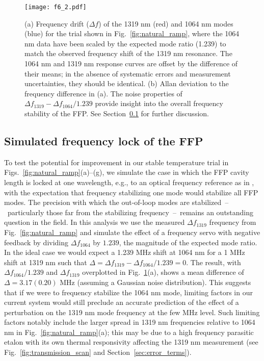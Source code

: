 \documentclass[10pt]{article}
\begin{document}
\begin{figure}
\texttt{[image: f6\_2.pdf]}
\caption{(a) Frequency drift ($\Delta f$) of the 1319 nm (red) and 1064 nm modes (blue) for the trial shown in Fig.~\ref{fig:natural_ramp}, where the 1064 nm data have been scaled by the expected mode ratio (1.239) to match the observed frequency shift of the 1319 nm resonance. The 1064 nm and 1319 nm response curves are offset by the difference of their means; in the absence of systematic errors and measurement uncertainties, they should be identical. (b) Allan deviation to the frequency difference in (a). The noise properties of $\Delta f_{1319} - \Delta f_{1064}/1.239$ provide insight into the overall frequency stability of the FFP. See Section~\ref{sec:servo} for further discussion.}
\label{fig:adev}
\end{figure}

\subsection{Simulated frequency lock of the FFP}
\label{sec:servo}
To test the potential for improvement in our stable temperature trial in Figs.~\ref{fig:natural_ramp}(a)--(g), we simulate the case in which the FFP cavity length is locked at one wavelength, e.g., to an optical frequency reference as in \cite{Banerjee:2003,Reiners:2014,Schwab:2015}, with the expectation that frequency stabilizing one mode would stabilize all FFP modes.  The precision with which the out-of-loop modes are stabilized\ --\ particularly those far from the stabilizing frequency\ --\ remains an outstanding question in the field.  In this analysis we use the measured $\Delta f_{1319}$ frequency from Fig.~\ref{fig:natural_ramp} and simulate the effect of a frequency servo with negative feedback by dividing $\Delta f_{1064}$ by $1.239$, the magnitude of the expected mode ratio.  In the ideal case we would expect a 1.239 MHz shift at 1064 nm for a 1 MHz shift at 1319 nm such that $\Delta = \Delta f_{1319} - \Delta f_{1064}/1.239 = 0$. The result, with $\Delta f_{1064}/1.239$ and $\Delta f_{1319}$ overplotted in Fig.~\ref{fig:adev}(a), shows a mean difference of $\Delta = 3.17(0.20)$ MHz (assuming a Gaussian noise distribution). This suggests that if we were to frequency stabilize the 1064 nm mode, limiting factors in our current system would still preclude an accurate prediction of the effect of a perturbation on the 1319 nm mode frequency at the few MHz level. Such limiting factors notably include the larger spread in 1319 nm frequencies relative to 1064 nm in Fig.~\ref{fig:natural_ramp}(a); this may be due to a high frequency parasitic etalon with its own thermal responsivity affecting the 1319 nm measurement (see Fig.~\ref{fig:transmission_scan} and Section~\ref{sec:error_terms}).
\end{document}
